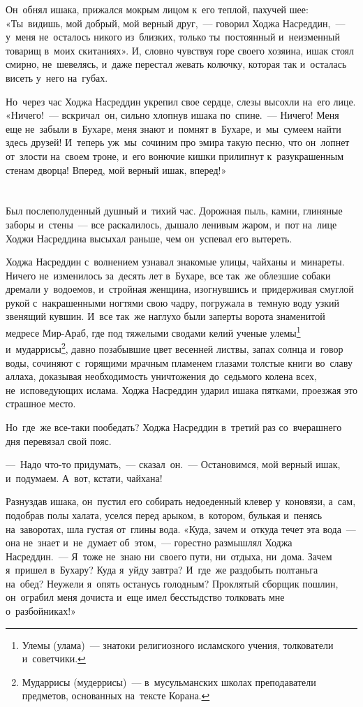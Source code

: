 \documentclass[12pt,a4paper]{book}
\begin{document}
Он~обнял ишака, прижался мокрым лицом к~его теплой, пахучей шее: «Ты~видишь, мой добрый, мой верный друг,~— говорил Ходжа Насреддин,~— у~меня не~осталось никого из~близких, только ты~постоянный и~неизменный товарищ в~моих скитаниях». И, словно чувствуя горе своего хозяина, ишак стоял смирно, не~шевелясь, и~даже перестал жевать колючку, которая так и~осталась висеть у~него на~губах.

Но~через час Ходжа Насреддин укрепил свое сердце, слезы высохли на~его лице. «Ничего!~— вскричал~он, сильно хлопнув ишака по~спине.~— Ничего! Меня еще не~забыли в~Бухаре, меня знают и~помнят в~Бухаре, и~мы~сумеем найти здесь друзей! И~теперь уж~мы~сочиним про эмира такую песню, что он~лопнет от~злости на~своем троне, и~его вонючие кишки прилипнут к~разукрашенным стенам дворца! Вперед, мой верный ишак, вперед!»


\chapter{}

Был послеполуденный душный и~тихий час. Дорожная пыль, камни, глиняные заборы и~стены~— все раскалилось, дышало ленивым жаром, и~пот на~лице Ходжи Насреддина высыхал раньше, чем он~успевал его вытереть.

Ходжа Насреддин с~волнением узнавал знакомые улицы, чайханы и~минареты. Ничего не~изменилось за~десять лет в~Бухаре, все так~же облезшие собаки дремали у~водоемов, и~стройная женщина, изогнувшись и~придерживая смуглой рукой с~накрашенными ногтями свою чадру, погружала в~темную воду узкий звенящий кувшин. И~все так~же наглухо были заперты ворота знаменитой медресе Мир-Араб, где под тяжелыми сводами келий ученые улемы\footnote{Улемы (улама)~— знатоки религиозного исламского учения, толкователи и~советчики.} и~мударрисы\footnote{Мударрисы (мудеррисы)~— в~мусульманских школах преподаватели предметов, основанных на~тексте Корана.}, давно позабывшие цвет весенней листвы, запах солнца и~говор воды, сочиняют с~горящими мрачным пламенем глазами толстые книги во~славу аллаха, доказывая необходимость уничтожения до~седьмого колена всех, не~исповедующих ислама. Ходжа Насреддин ударил ишака пятками, проезжая это страшное место.

Но~где~же все-таки пообедать? Ходжа Насреддин в~третий раз со~вчерашнего дня перевязал свой пояс.

—~Надо что-то придумать,~— сказал~он.~— Остановимся, мой верный ишак, и~подумаем. А~вот, кстати, чайхана!

Разнуздав ишака, он~пустил его собирать недоеденный клевер у~коновязи, а~сам, подобрав полы халата, уселся перед арыком, в~котором, булькая и~пенясь на~заворотах, шла густая от~глины вода. «Куда, зачем и~откуда течет эта вода~— она не~знает и~не~думает об~этом,~— горестно размышлял Ходжа Насреддин.~— Я~тоже не~знаю ни~своего пути, ни~отдыха, ни~дома. Зачем я~пришел в~Бухару? Куда я~уйду завтра? И~где~же раздобыть полтаньга на~обед? Неужели я~опять останусь голодным? Проклятый сборщик пошлин, он~ограбил меня дочиста и~еще имел бесстыдство толковать мне о~разбойниках!»
\end{document}
